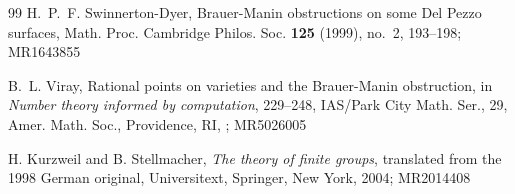\begin{thebibliography}{99}
H.~P.~F. Swinnerton-Dyer, Brauer-Manin obstructions on some Del Pezzo surfaces, Math. Proc. Cambridge Philos. Soc. {\bf 125} (1999), no.~2, 193--198; MR1643855

B.~L. Viray, Rational points on varieties and the Brauer-Manin obstruction, in {\it Number theory informed by computation}, 229--248, IAS/Park City Math. Ser., 29, Amer. Math. Soc., Providence, RI, ; MR5026005

H. Kurzweil and B. Stellmacher, {\it The theory of finite groups}, translated from the 1998 German original, Universitext, Springer, New York, 2004; MR2014408


\end{thebibliography}
